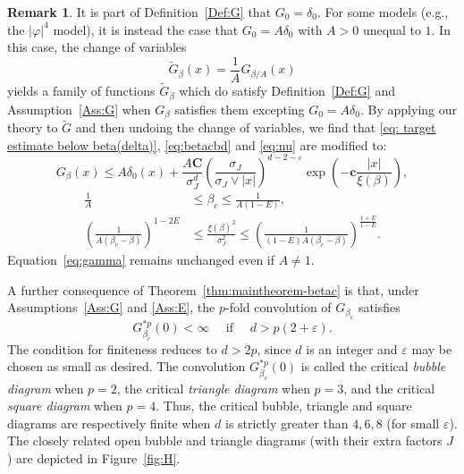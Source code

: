 \documentclass[11pt,a4paper]{article}
\numberwithin{equation}{section}
\theoremstyle{plain}
\theoremstyle{definition}
\newtheorem{Rem}[Thm]{Remark}
\newcommand\1{\mathds{1}}
\newcommand\bfc{\mathbf{c}}
\newcommand\bfC{\mathbf{C}}
\begin{document}
\begin{Rem}
\label{Rem:A}
It is part of Definition~\ref{Def:G} that $G_0=\delta_0$.
For some models
(e.g., the $|\varphi|^4$ model), it is instead the case that $G_0=A\delta_0$ with $A>0$ unequal to $1$. In this case, the change of variables
\begin{equation}
    \widetilde{G}_{\beta}(x) = \frac{1}{A} G_{\beta/A}(x)
\end{equation}
yields a family of functions $\widetilde G_\beta$ which do satisfy Definition~\ref{Def:G}
and Assumption~\ref{Ass:G} when $G_\beta$ satisfies them excepting $G_0=A\delta_0$.
By applying our theory to $\widetilde G$ and then undoing the change of variables,
we find that \eqref{eq: target estimate below beta(delta)}, \eqref{eq:betacbd}
and \eqref{eq:nu} are modified to:
\begin{equation}
	G_\beta(x)\leq A\delta_0(x)
    + \frac{A \bfC}{\sigma_J^d}
    \left(\frac{\sigma_J}{\sigma_J \vee|x|} \right)^{d-2-\varepsilon}
    \exp\left(-\bfc\frac{|x|}{\xi(\beta)}\right),
\end{equation}
 \begin{align}
 \label{eq:betacbdA}
    \frac{1}{A} &\le \beta_c \le \frac{1}{A(1-E)},
    \\
\label{eq:nuA}
    \left( \frac{1}{A(\beta_c -\beta)} \right)^{1-2E}
    &\le
    \frac{\xi(\beta)^2}{\sigma_J^2}
    \le
    \left( \frac{1}{(1-E)A(\beta_c -\beta)} \right)^{\frac{1+E}{1-E}}
    .
 \end{align}
Equation~\eqref{eq:gamma} remains unchanged even if $A\neq 1$.
\end{Rem}


A further consequence of Theorem~\ref{thm:maintheorem-betac} is that, under
Assumptions~\ref{Ass:G} and \ref{Ass:E}, the $p$-fold convolution of $G_{\beta_c}$
satisfies
\begin{equation}
    G_{\beta_c}^{*p}(0) < \infty \quad \text{ if } \quad
    d>p(2+\varepsilon).
\end{equation}
The condition for finiteness reduces to $d>2p$,
since $d$ is an integer and $\varepsilon$ may be chosen as small as desired.
The convolution $G_{\beta_c}^{*p}(0)$ is called the critical \emph{bubble diagram} when $p=2$,
the critical \emph{triangle diagram} when $p=3$, and the critical \emph{square diagram}
when $p=4$.
Thus, the critical bubble, triangle and square diagrams
are respectively finite when $d$ is strictly greater than $4,6,8$ (for small $\varepsilon$).
The closely related open bubble and triangle diagrams (with their extra factors $J$)
are depicted in Figure~\ref{fig:H}.
\end{document}
